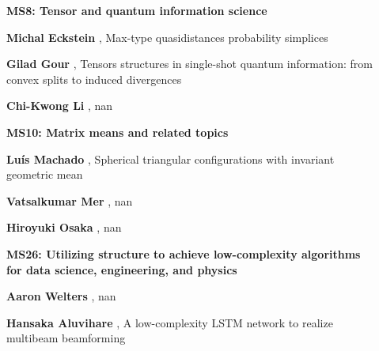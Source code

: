 \documentclass[ILAS2025-program.tex]{subfiles}
\begin{document}
\begin{description}
\begin{description}
    \item[] {\color{mstitle}\textbf{MS8: Tensor and quantum information science}} 
    \item[] \textbf{Michal Eckstein} , Max-type quasidistances probability simplices
        \item[] \textbf{Gilad Gour} , Tensors structures in single-shot quantum information: from convex splits to induced divergences
        \item[] \textbf{Chi-Kwong Li} , nan
        \end{description}
    \begin{description}
    \item[] {\color{mstitle}\textbf{MS10: Matrix means and related topics}} 
    \item[] \textbf{Luís Machado} , Spherical triangular configurations with invariant geometric mean
        \item[] \textbf{Vatsalkumar Mer} , nan
        \item[] \textbf{Hiroyuki Osaka} , nan
        \end{description}
    \begin{description}
    \item[] {\color{mstitle}\textbf{MS26: Utilizing structure to achieve low-complexity algorithms for data science, engineering, and physics}} 
    \item[] \textbf{Aaron Welters} , nan
        \item[] \textbf{Hansaka Aluvihare} , A low-complexity LSTM network to realize multibeam beamforming


\end{description}
\end{description}
\end{document}
